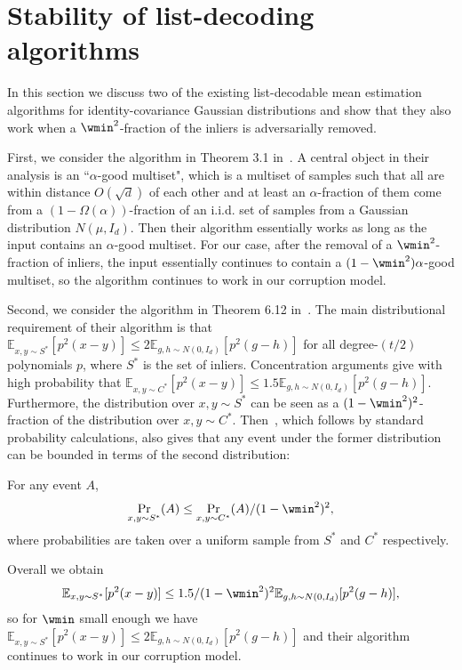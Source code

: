 \section{Stability of list-decoding algorithms}
\label{app:stability}
In this section we discuss two of the existing list-decodable mean estimation algorithms for identity-covariance Gaussian distributions and show that they also work when a $\wmin^2$-fraction of the inliers is adversarially removed.

First, we consider the algorithm in Theorem 3.1 in~\cite{diakonikolas2018list}.
A central object in their analysis is an ``$\alpha$-good multiset", which is a multiset of samples such that all are within distance $O(\sqrt{d})$ of each other and at least an $\alpha$-fraction of them come from a $(1-\Omega(\alpha))$-fraction of an i.i.d. set of samples from a Gaussian distribution $N(\mu, I_d)$.
Then their algorithm essentially works as long as the input contains an $\alpha$-good multiset.
For our case, after the removal of a $\wmin^2$-fraction of inliers, the input  essentially continues to contain a $(1-\wmin^2)\alpha$-good multiset, so the algorithm continues to work in our corruption model.

Second, we consider the algorithm in Theorem 6.12 in~\cite{diakonikolas2023algorithmic}.
The main distributional requirement of their algorithm is that $\mathbb{E}_{x,y \sim S^*} [p^2(x-y)] \leq 2\mathbb{E}_{g, h\sim N(0, I_d)}[p^2(g-h)]$ for all degree-$(t/2)$ polynomials $p$, where $S^*$ is the set of inliers.
Concentration arguments give with high probability that $\mathbb{E}_{x,y \sim C^*} [p^2(x-y)] \leq 1.5\mathbb{E}_{g, h\sim N(0, I_d)}[p^2(g-h)]$.
Furthermore, the distribution over $x, y \sim S^*$ can be seen as a $(1-\wmin^2)^2$-fraction of the distribution over $x, y \sim C^*$. 
Then~, which follows by standard probability calculations, also gives that any event under the former distribution can be bounded in terms of the second distribution:

\begin{fact}
\label{fact:stability}
    For any event \(A\), 
    \begin{equation}
        \Pr_{x, y \sim S^{\ast}}(A) \leq \Pr_{x, y \sim C^{\ast}}(A) / (1 - \wmin^2)^2,
    \end{equation}
    where probabilities are taken over a uniform sample from \(S^{\ast}\) and \(C^{\ast}\) respectively.
\end{fact}

Overall we obtain
\[\mathbb{E}_{x,y \sim S^*} [p^2(x-y)] \leq 1.5/(1-\wmin^2)^2\mathbb{E}_{g, h\sim N(0, I_d)}[p^2(g-h)],\]
so for $\wmin$ small enough we have $\mathbb{E}_{x,y \sim S^*} [p^2(x-y)] \leq 2\mathbb{E}_{g, h\sim N(0, I_d)}[p^2(g-h)]$ and their algorithm continues to work in our corruption model.